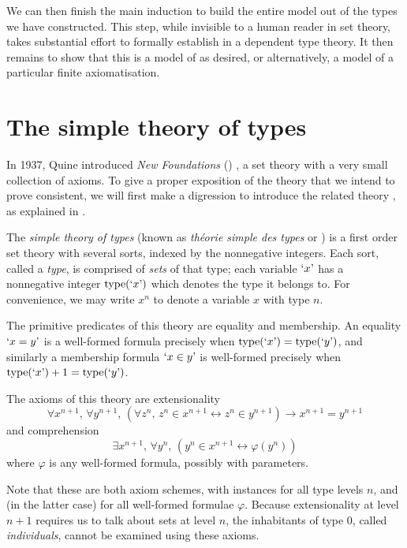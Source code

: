 We can then finish the main induction to build the entire model out of the types we have constructed.
This step, while invisible to a human reader in set theory, takes substantial effort to formally establish in a dependent type theory.
It then remains to show that this is a model of {\TTT} as desired, or alternatively, a model of a particular finite axiomatisation.

\section{The simple theory of types}

In 1937, Quine introduced \emph{New Foundations} (\NF) \cite{quine-nf}, a set theory with a very small collection of axioms.
To give a proper exposition of the theory that we intend to prove consistent, we will first make a digression to introduce the related theory {\TST}, as explained in \cite{con-nf}.

The \emph{simple theory of types} (known as \emph{théorie simple des types} or {\TST}) is a first order set theory with several sorts, indexed by the nonnegative integers.
Each sort, called a \emph{type}, is comprised of \emph{sets} of that type; each variable \( \mquote{x} \) has a nonnegative integer \( \ttype(\mquote x) \) which denotes the type it belongs to.
For convenience, we may write \( x^n \) to denote a variable \( x \) with type \( n \).

The primitive predicates of this theory are equality and membership.
An equality \( \mquote{x = y} \) is a well-formed formula precisely when \( \ttype(\mquote{x}) = \ttype(\mquote{y}) \), and similarly a membership formula \( \mquote{x \in y} \) is well-formed precisely when \( \ttype(\mquote{x}) + 1 = \ttype(\mquote{y}) \).

The axioms of this theory are extensionality
\[ \forall x^{n + 1},\, \forall y^{n + 1},\, (\forall z^n,\, z^n \in x^{n+1} \leftrightarrow z^n \in y^{n+1}) \to x^{n+1} = y^{n+1} \]
and comprehension
\[ \exists x^{n + 1},\, \forall y^n,\, (y^n \in x^{n+1} \leftrightarrow \varphi(y^n)) \]
where \( \varphi \) is any well-formed formula, possibly with parameters.

Note that these are both axiom schemes, with instances for all type levels \( n \), and (in the latter case) for all well-formed formulae \( \varphi \).
Because extensionality at level \( n + 1 \) requires us to talk about sets at level \( n \), the inhabitants of type 0, called \emph{individuals}, cannot be examined using these axioms.

